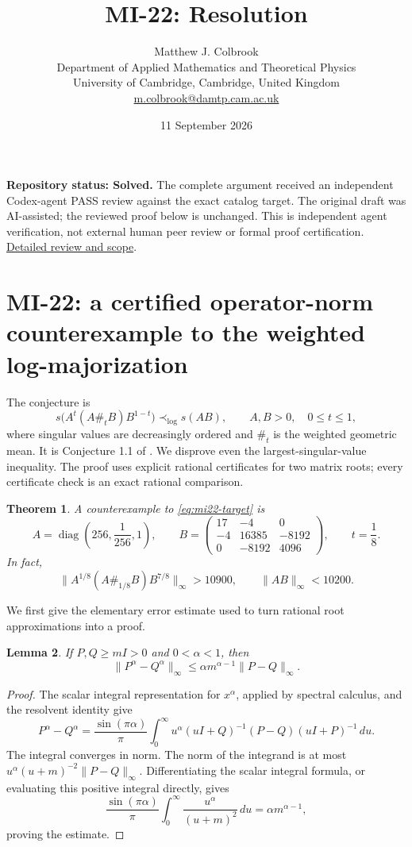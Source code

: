 \documentclass[10pt,a4paper]{article}
\title{MI-22: Resolution}
\author{Matthew J. Colbrook\\
\small Department of Applied Mathematics and Theoretical Physics\\
\small University of Cambridge, Cambridge, United Kingdom\\
\small\href{mailto:m.colbrook@damtp.cam.ac.uk}{m.colbrook@damtp.cam.ac.uk}}
\date{11 September 2026}
\newtheorem{theorem}{Theorem}[section]
\newtheorem{lemma}[theorem]{Lemma}
\theoremstyle{remark}
\newcommand{\diag}{\operatorname{diag}}
\newcommand{\opnorm}[1]{\lVert #1\rVert_{\infty}}
\begin{document}
\maketitle
\textbf{Repository status: Solved.}
The complete argument received an independent Codex-agent PASS review
against the exact catalog target.
The original draft was AI-assisted; the reviewed proof below is unchanged.
This is independent agent verification, not external human peer review or
formal proof certification. \href{https://github.com/ajt60gaibb/OpenProblemsInNLA/blob/main/references/colbrook-matrix-2026-09-11/verification/reviews/MI-22-review.md}{Detailed review and scope}.
\par\medskip
\section{MI-22: a certified operator-norm counterexample to the weighted log-majorization}
\label{sec:mi22}
The conjecture is
\begin{equation}\label{eq:mi22-target}
 s\bigl(A^t(A\#_t B)B^{1-t}\bigr)\prec_{\log}s(AB),
 \qquad A,B>0,\quad 0\leq t\leq1,
\end{equation}
where singular values are decreasingly ordered and $\#_t$ is the weighted geometric mean. It is Conjecture 1.1 of \cite{GAMA2021}. We disprove even the largest-singular-value inequality. The proof uses explicit rational certificates for two matrix roots; every certificate check is an exact rational comparison.

\begin{theorem}\label{thm:mi22}
A counterexample to \eqref{eq:mi22-target} is
\[
 A=\diag\left(256,\frac1{256},1\right),\qquad
 B=\begin{pmatrix}17&-4&0\\-4&16385&-8192\\0&-8192&4096\end{pmatrix},
 \qquad t=\frac18.
\]
In fact,
\[
 \opnorm{A^{1/8}(A\#_{1/8}B)B^{7/8}}>10900,
 \qquad \opnorm{AB}<10200.
\]
\end{theorem}

We first give the elementary error estimate used to turn rational root approximations into a proof.
\begin{lemma}\label{lem:root-lipschitz}
If $P,Q\geq mI>0$ and $0<\alpha<1$, then
\[
 \opnorm{P^\alpha-Q^\alpha}
 \leq \alpha m^{\alpha-1}\opnorm{P-Q}.
\]
\end{lemma}
\begin{proof}
The scalar integral representation for $x^\alpha$, applied by spectral calculus, and the resolvent identity give
\[
 P^\alpha-Q^\alpha
 =\frac{\sin(\pi\alpha)}{\pi}\int_0^\infty
 u^\alpha(uI+Q)^{-1}(P-Q)(uI+P)^{-1}\,du.
\]
The integral converges in norm. The norm of the integrand is at most
$u^\alpha(u+m)^{-2}\opnorm{P-Q}$. Differentiating the scalar integral formula, or evaluating this positive integral directly, gives
\[
 \frac{\sin(\pi\alpha)}{\pi}\int_0^\infty\frac{u^\alpha}{(u+m)^2}\,du
 =\alpha m^{\alpha-1},
\]
proving the estimate.
\end{proof}
\end{document}
